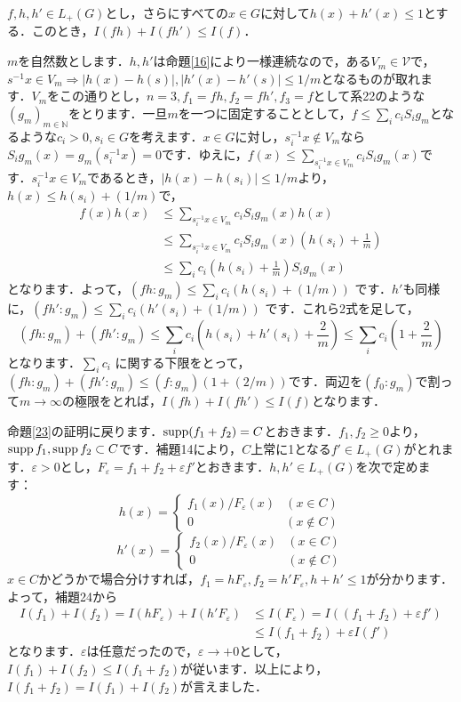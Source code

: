 \begin{Proof}
\begin{ylem}\label{24}
$f, h, h'\in L_{+}(G)$とし，さらにすべての$x \in G$に対して$h(x)+h'(x) \le 1$とする．このとき，$I(fh)+I(fh') \le I(f)$．
\end{ylem}
\begin{Proof}
$m$を自然数とします．$h,h'$は命題\ref{16}により一様連続なので，ある$V_m \in \mathscr{V}$で，$s^{-1}x \in V_{m} \Rightarrow |h(x)-h(s)|, |h'(x)-h'(s)| \le 1/m$となるものが取れます．$V_m$をこの通りとし，$n=3, f_1=fh, f_2=fh', f_3=f$として系22のような$(g_m)_{m \in \mathbb{N}}$をとります．一旦$m$を一つに固定することとして，$f \le \sum_{i}c_i S_{i}g_m$となるような$c_i>0, s_i \in G$を考えます．$x \in G$に対し，$s_{i}^{-1}x \not\in V_m$なら$S_{i}g_{m}(x)=g_{m}(s_{i}^{-1}x)=0$です．ゆえに，$f(x) \le \sum_{s_{i}^{-1}x \in V_m} c_{i}S_{i}g_{m}(x)$です．$s_{i}^{-1}x \in V_m$であるとき，$|h(x)-h(s_i)| \le 1/m$より，$h(x) \le h(s_i)+(1/m)$で，
\begin{align*}
f(x)h(x)  & \le \sum_{s_{i}^{-1}x \in V_m} c_{i}S_{i}g_{m}(x)h(x) \\
& \le \sum_{s_{i}^{-1}x \in V_m} c_{i}S_{i}g_{m}(x) \left( h(s_i)+\frac{1}{m} \right) \\
& \le \sum_{i}c_{i} \left( h(s_i)+\frac{1}{m} \right) S_{i}g_{m}(x)
\end{align*}
となります．よって，$( fh : g_m ) \le \sum_{i}c_{i} ( h(s_i)+(1/m) )$ です．$h'$も同様に，$( fh' : g_m ) \le \sum_{i}c_{i} ( h'(s_i)+(1/m) )$ です．これら2式を足して，
\[
( fh : g_m )+( fh' : g_m ) \le \sum_{i}c_{i} \left( h(s_i)+h'(s_i)+\frac{2}{m} \right) \le \sum_{i}c_{i} \left( 1+\frac{2}{m} \right)
\]
となります．$\sum_{i}c_{i}$ に関する下限をとって，$( fh : g_m )+( fh' : g_m ) \le ( f : g_m ) ( 1+(2/m) )$です．両辺を$(f_0 : g_m)$で割って$m \to \infty$の極限をとれば，$I(fh)+I(fh') \le I(f)$となります．　
\end{Proof}
命題\ref{23}の証明に戻ります．$\operatorname{supp} (f_{1}+f_{2})=C$とおきます．$f_1, f_2 \ge 0$より，$\operatorname{supp} f_1, \operatorname{supp} f_2 \subset C$です．補題14により，$C$上常に1となる$f' \in L_{+}(G)$がとれます．$\varepsilon>0$とし，$F_{\varepsilon}=f_{1}+f_{2}+\varepsilon f'$とおきます．$h,h' \in L_{+}(G)$を次で定めます：
\[
h(x)=
\begin{cases}
f_{1}(x)/F_{\varepsilon}(x) & (x \in C) \\
0 & (x \not\in C)
\end{cases}
\]
\[
h'(x)=
\begin{cases}
f_{2}(x)/F_{\varepsilon}(x) & (x \in C) \\
0 & (x \not\in C)
\end{cases}
\]
$x \in C$かどうかで場合分けすれば，$f_{1}=hF_{\varepsilon}, f_{2}=h'F_{\varepsilon}, h+h' \le 1$が分かります．よって，補題24から
\begin{align*}
I(f_1)+I(f_2) = I(hF_{\varepsilon})+I(h'F_{\varepsilon}) & \le I(F_{\varepsilon})=I ( (f_{1}+f_{2})+\varepsilon f' ) \\
& \le I(f_{1}+f_{2})+ \varepsilon I(f')
\end{align*}
となります．$\varepsilon$は任意だったので，$\varepsilon \to +0$として，$I(f_1)+I(f_2) \le I(f_{1}+f_{2})$が従います．以上により，$I(f_{1}+f_{2})=I(f_{1})+I(f_{2})$が言えました．　
\end{Proof}

